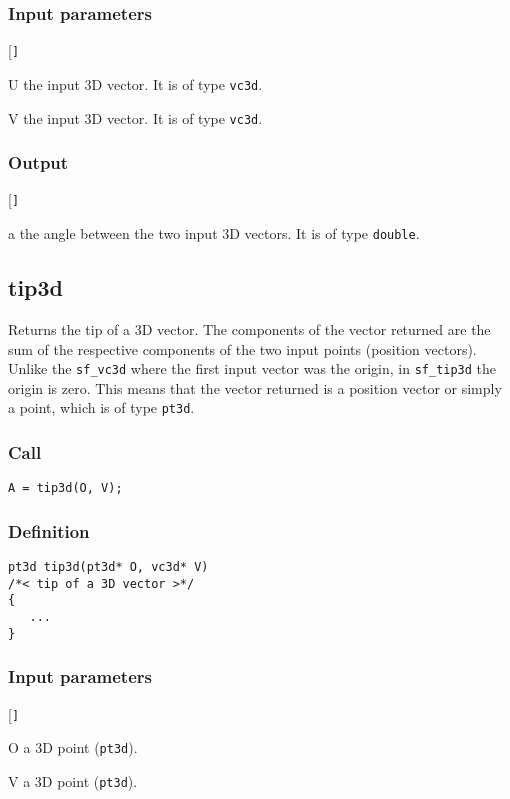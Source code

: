 \subsubsection*{Input parameters}
\begin{desclist}{\tt }{\quad}[\tt ]
   \setlength\itemsep{0pt}
   \item[U] the input 3D vector. It is of type \texttt{vc3d}. 
   \item[V] the input 3D vector. It is of type \texttt{vc3d}.
\end{desclist}

\subsubsection*{Output}
\begin{desclist}{\tt }{\quad}[\tt ]
   \setlength\itemsep{0pt}
   \item[a] the angle between the two input 3D vectors. It is of type \texttt{double}.
\end{desclist}





\subsection{{tip3d}}
Returns the tip of a 3D vector. The components of the vector returned are the sum of the respective components of the two input points (position vectors). Unlike the \texttt{sf\_vc3d} where the first input vector was the origin, in \texttt{sf\_tip3d} the origin is zero. This means that the vector returned is a position vector or simply a point, which is of type \texttt{pt3d}.

\subsubsection*{Call}
\begin{verbatim}A = tip3d(O, V);\end{verbatim}

\subsubsection*{Definition}
\begin{verbatim}
pt3d tip3d(pt3d* O, vc3d* V)
/*< tip of a 3D vector >*/
{
   ...    
}
\end{verbatim}

\subsubsection*{Input parameters}
\begin{desclist}{\tt }{\quad}[\tt ]
   \setlength\itemsep{0pt}
   \item[O] a 3D point (\texttt{pt3d}). 
   \item[V] a 3D point (\texttt{pt3d}).     
\end{desclist}

